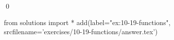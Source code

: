 
\begin{ex}
  \label{ex:10-19-functions}
  
  \qed
\end{ex}
\begin{python0}
from solutions import *
add(label="ex:10-19-functions",
    srcfilename='exercises/10-19-functions/answer.tex')
\end{python0}
